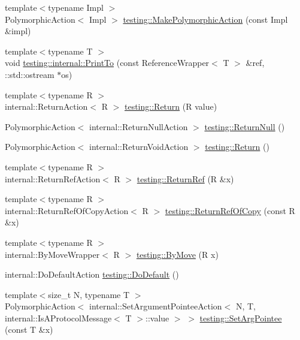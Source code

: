 \begin{DoxyCompactItemize}
\item 
{\footnotesize template$<$typename Impl $>$ }\\Polymorphic\+Action$<$ Impl $>$ \hyperlink{namespacetesting_a36bd06c5ea972c6df0bd9f40a7a94c65}{testing\+::\+Make\+Polymorphic\+Action} (const Impl \&impl)
\item 
{\footnotesize template$<$typename T $>$ }\\void \hyperlink{namespacetesting_1_1internal_a8fd10cc30084c36a89c74868c8bd53f8}{testing\+::internal\+::\+Print\+To} (const Reference\+Wrapper$<$ T $>$ \&ref, \+::std\+::ostream $\ast$os)
\item 
{\footnotesize template$<$typename R $>$ }\\internal\+::\+Return\+Action$<$ R $>$ \hyperlink{namespacetesting_af6d1c13e9376c77671e37545cd84359c}{testing\+::\+Return} (R value)
\item 
Polymorphic\+Action$<$ internal\+::\+Return\+Null\+Action $>$ \hyperlink{namespacetesting_aa0331596e269114da101f810d3a1b88b}{testing\+::\+Return\+Null} ()
\item 
Polymorphic\+Action$<$ internal\+::\+Return\+Void\+Action $>$ \hyperlink{namespacetesting_a8da8e53d2e7bc4e3c531f7435ad04823}{testing\+::\+Return} ()
\item 
{\footnotesize template$<$typename R $>$ }\\internal\+::\+Return\+Ref\+Action$<$ R $>$ \hyperlink{namespacetesting_a18eda8fe9c89ee856c199a2e04ca1641}{testing\+::\+Return\+Ref} (R \&x)
\item 
{\footnotesize template$<$typename R $>$ }\\internal\+::\+Return\+Ref\+Of\+Copy\+Action$<$ R $>$ \hyperlink{namespacetesting_ac1b75444c89371dc25ebcfcc48336201}{testing\+::\+Return\+Ref\+Of\+Copy} (const R \&x)
\item 
{\footnotesize template$<$typename R $>$ }\\internal\+::\+By\+Move\+Wrapper$<$ R $>$ \hyperlink{namespacetesting_acaa432211a3aec62e3d0f24b47bd2dae}{testing\+::\+By\+Move} (R x)
\item 
internal\+::\+Do\+Default\+Action \hyperlink{namespacetesting_ae041df61ff61ccb9753ba15b4309e1a6}{testing\+::\+Do\+Default} ()
\item 
{\footnotesize template$<$size\+\_\+t N, typename T $>$ }\\Polymorphic\+Action$<$ internal\+::\+Set\+Argument\+Pointee\+Action$<$ N, T, internal\+::\+Is\+A\+Protocol\+Message$<$ T $>$\+::value $>$ $>$ \hyperlink{namespacetesting_a5740a5033b88c37666fcd09a269d123f}{testing\+::\+Set\+Arg\+Pointee} (const T \&x)

\end{DoxyCompactItemize}
